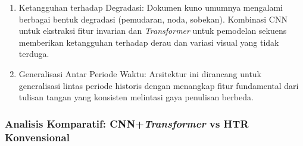 \documentclass[12pt,a4paper]{article}
\begin{document}
\begin{enumerate}[leftmargin=*, labelindent=0pt, itemsep=1ex, topsep=0pt]
\begin{enumerate}[leftmargin=1.5em, labelsep=0.5em, itemindent=0pt, label=\alph*., topsep=0pt, parsep=0pt, itemsep=0pt]
      \item Ketangguhan terhadap Degradasi: Dokumen kuno umumnya mengalami berbagai bentuk degradasi (pemudaran, noda, sobekan). Kombinasi CNN untuk ekstraksi fitur invarian dan \textit{Transformer} untuk pemodelan sekuens memberikan ketangguhan terhadap derau dan variasi visual yang tidak terduga.

      \item Generalisasi Antar Periode Waktu: Arsitektur ini dirancang untuk generalisasi lintas periode historis dengan menangkap fitur fundamental dari tulisan tangan yang konsisten melintasi gaya penulisan berbeda.
\end{enumerate}

\end{enumerate}

\subsubsection{Analisis Komparatif: CNN+\textit{Transformer} vs HTR Konvensional}
\label{subsubsec:analisis-komparatif-transformer}
\end{document}
